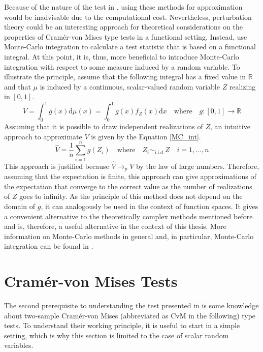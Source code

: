 \documentclass[12pt, a4paper]{article}
\theoremstyle{MAstyle} \newtheorem{assumption}{Assumption}[section]
\theoremstyle{MAstyle} \newtheorem{definition}{Definition}[section]
\theoremstyle{MAstyle} \newtheorem{theorem}{Theorem}[section]
\begin{document}
			Because of the nature of the test in \cite{bugni_permutation_2021}, using these methods for approximation would be inadvisable due to the computational cost. Nevertheless, perturbation theory could be an interesting approach for theoretical considerations on the properties of Cram\'{e}r-von Mises type tests in a functional setting. 
			Instead, \cite{bugni_permutation_2021} use Monte-Carlo integration to calculate a test statistic that is based on a functional integral. At this point, it is, thus, more beneficial to introduce Monte-Carlo integration with respect to some measure induced by a random variable. 
			To illustrate the principle, assume that the following integral has a fixed value in $\mathbb{R}$ and that $\mu$ is induced by a continuous, scalar-valued random variable $Z$ realizing in $[0,1]$.
			\begin{equation}
				V = \int_{0}^{1} g(x) \mathrm{d}\mu(x) = \int_{0}^{1} g(x) f_Z(x) \mathrm{d}x \quad \text{where} \quad g:[0,1] \rightarrow \mathbb{R}
			\end{equation}
			Assuming that it is possible to draw independent realizations of $Z$, an intuitive approach to approximate $V$ is given by the Equation \ref{MC_int}.
			\begin{equation}\label{MC_int}
				\hat{V} = \frac{1}{n} \sum_{i = 1}^{n} g(Z_i) \quad \text{where} \quad Z_i \sim_{\text{i.i.d.}} Z \quad i = 1, \dots, n
			\end{equation}
			This approach is justified because $\hat{V} \rightarrow_p V$ by the law of large numbers.
			Therefore, assuming that the expectation is finite, this approach can give approximations of the expectation that converge to the correct value as the number of realizations of $Z$ goes to infinity.
			As the principle of this method does not depend on the domain of $g$, it can analogously be used in the context of function spaces. It gives a convenient alternative to the theoretically complex methods mentioned before and is, therefore, a useful alternative in the context of this thesis. More information on Monte-Carlo methods in general and, in particular, Monte-Carlo integration can be found in \cite{shonkwiler_explorations_2009}.
		
	\section{Cram\'{e}r-von Mises Tests}\label{CvM_Tests}
		The second prerequisite to understanding the test presented in \cite{bugni_permutation_2021} is some knowledge about two-sample Cram\'er-von Mises (abbreviated as CvM in the following) type tests. To understand their working principle, it is useful to start in a simple setting, which is why this section is limited to the case of scalar random variables.\\
		
\end{document}
